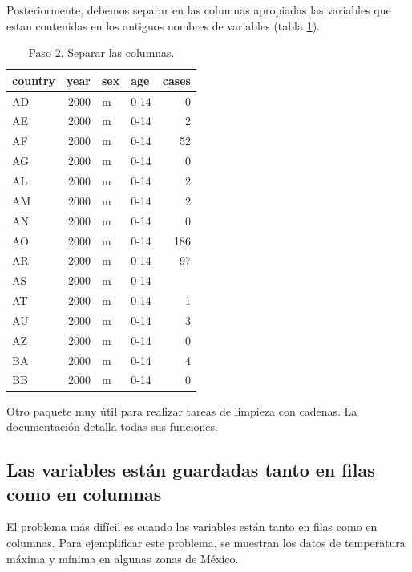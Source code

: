 \documentclass[]{article}
\begin{document}
Posteriormente, debemos separar en las columnas apropiadas las variables
que estan contenidas en los antiguos nombres de variables (tabla
\ref{tab:tbseparar}).

\begin{table}[ht]
\centering
\begin{tabular}{lrllr}
  \hline
country & year & sex & age & cases \\ 
  \hline
AD & 2000 & m & 0-14 &   0 \\ 
  AE & 2000 & m & 0-14 &   2 \\ 
  AF & 2000 & m & 0-14 &  52 \\ 
  AG & 2000 & m & 0-14 &   0 \\ 
  AL & 2000 & m & 0-14 &   2 \\ 
  AM & 2000 & m & 0-14 &   2 \\ 
  AN & 2000 & m & 0-14 &   0 \\ 
  AO & 2000 & m & 0-14 & 186 \\ 
  AR & 2000 & m & 0-14 &  97 \\ 
  AS & 2000 & m & 0-14 &  \\ 
  AT & 2000 & m & 0-14 &   1 \\ 
  AU & 2000 & m & 0-14 &   3 \\ 
  AZ & 2000 & m & 0-14 &   0 \\ 
  BA & 2000 & m & 0-14 &   4 \\ 
  BB & 2000 & m & 0-14 &   0 \\ 
   \hline
\end{tabular}
\caption{Paso 2. Separar las columnas.} 
\label{tab:tbseparar}
\end{table}

\begin{nota}[stringr]
Otro paquete muy útil para realizar tareas de limpieza con cadenas. 
La \href{https://cran.r-project.org/web/packages/stringr/stringr.pdf}{documentación}
detalla todas sus funciones.
\end{nota}

\subsection{Las variables están guardadas tanto en filas como en
columnas}\label{las-variables-estan-guardadas-tanto-en-filas-como-en-columnas}

El problema más difícil es cuando las variables están tanto en filas
como en columnas. Para ejemplificar este problema, se muestran los datos
de temperatura máxima y mínima en algunas zonas de México.
\end{document}
